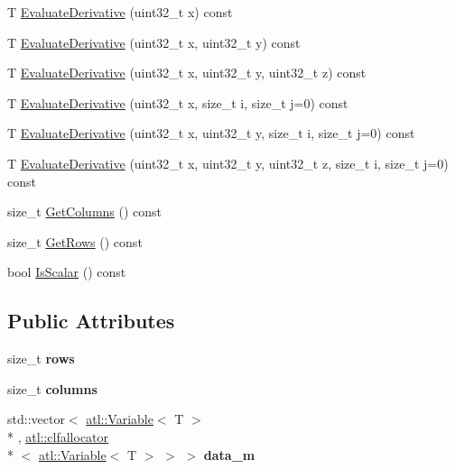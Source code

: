 \begin{DoxyCompactItemize}
\item 
T \hyperlink{structatl_1_1_variable_matrix_a2892998b53099125116cb6fc92ae2eef}{Evaluate\+Derivative} (uint32\+\_\+t x) const 
\item 
T \hyperlink{structatl_1_1_variable_matrix_af9d21b0cd88c29b65e48dd47419fd1f5}{Evaluate\+Derivative} (uint32\+\_\+t x, uint32\+\_\+t y) const 
\item 
T \hyperlink{structatl_1_1_variable_matrix_aa149ea3e1fd7dcfb90f41e6e3f847eb5}{Evaluate\+Derivative} (uint32\+\_\+t x, uint32\+\_\+t y, uint32\+\_\+t z) const 
\item 
T \hyperlink{structatl_1_1_variable_matrix_a9bed2ae3ac39bb9574fcdbdff3badf47}{Evaluate\+Derivative} (uint32\+\_\+t x, size\+\_\+t i, size\+\_\+t j=0) const 
\item 
T \hyperlink{structatl_1_1_variable_matrix_a4c084e102edd1acfdd1a6211bfa5f312}{Evaluate\+Derivative} (uint32\+\_\+t x, uint32\+\_\+t y, size\+\_\+t i, size\+\_\+t j=0) const 
\item 
T \hyperlink{structatl_1_1_variable_matrix_a2a1af09f111aed65d69a44651cb36ced}{Evaluate\+Derivative} (uint32\+\_\+t x, uint32\+\_\+t y, uint32\+\_\+t z, size\+\_\+t i, size\+\_\+t j=0) const 
\item 
size\+\_\+t \hyperlink{structatl_1_1_variable_matrix_aa23031ddb3becdaa0c36717bd9b44f5c}{Get\+Columns} () const 
\item 
size\+\_\+t \hyperlink{structatl_1_1_variable_matrix_a256ec551bfd19efc13d89a9b993d992a}{Get\+Rows} () const 
\item 
bool \hyperlink{structatl_1_1_variable_matrix_ab08d56cb74dda075d1764865f3e8fd07}{Is\+Scalar} () const 
\end{DoxyCompactItemize}
\subsection*{Public Attributes}
\begin{DoxyCompactItemize}
\item 
\hypertarget{structatl_1_1_variable_matrix_ae33cc85e892a1e8622b22f39a86b1dd9}{size\+\_\+t {\bfseries rows}}\label{structatl_1_1_variable_matrix_ae33cc85e892a1e8622b22f39a86b1dd9}

\item 
\hypertarget{structatl_1_1_variable_matrix_a88ba4cdd712df04884811e9c43c25956}{size\+\_\+t {\bfseries columns}}\label{structatl_1_1_variable_matrix_a88ba4cdd712df04884811e9c43c25956}

\item 
\hypertarget{structatl_1_1_variable_matrix_ab005ef7a62ac08c6d4c2afc0813b0ddb}{std\+::vector$<$ \hyperlink{structatl_1_1_variable}{atl\+::\+Variable}$<$ T $>$\\*
, \hyperlink{structatl_1_1clfallocator}{atl\+::clfallocator}\\*
$<$ \hyperlink{structatl_1_1_variable}{atl\+::\+Variable}$<$ T $>$ $>$ $>$ {\bfseries data\+\_\+m}}\label{structatl_1_1_variable_matrix_ab005ef7a62ac08c6d4c2afc0813b0ddb}

\end{DoxyCompactItemize}


